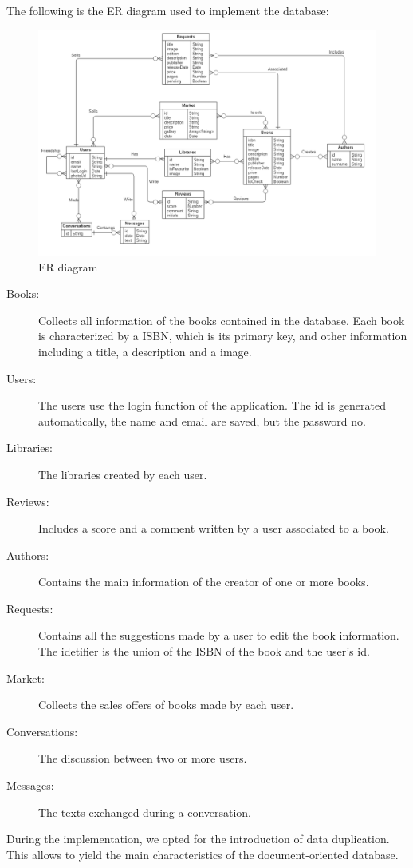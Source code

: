 The following is the ER diagram used to implement the database:
\begin{figure}[!h]
    \centering
    \includegraphics[scale=0.43]{images/er-diagram.png}
    \caption{ER diagram}
    \label{ref:erdiagram}
\end{figure}
\begin{description}
    \item[Books:] Collects all information of the books contained in the database. Each book is characterized  by a ISBN, which is its primary key, and other information including a title, a description and a image.
    \item[Users:] The users use the login function of the application. The id is generated automatically, the name and email are saved, but the password no.
    \item[Libraries:] The libraries created by each user.
    \item[Reviews:] Includes a score and a comment written by a user associated to a book.
    \item[Authors:] Contains the main information of the creator of one or more books.
    \item[Requests:] Contains all the suggestions made by a user to edit the book information. The idetifier is the union of the ISBN of the book and the user's id.
    \item[Market:] Collects the sales offers of books made by each user.
    \item[Conversations:] The discussion between two or more users.
    \item[Messages:] The texts exchanged during a conversation.
\end{description}
During the implementation, we opted for the introduction of data duplication. This allows to yield the main characteristics of the document-oriented database.
\clearpage
